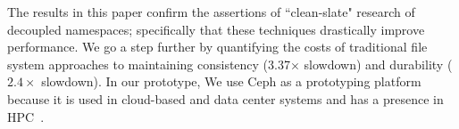 The results in this paper confirm the assertions of ``clean-slate" research of
decoupled namespaces; specifically that these techniques drastically improve
performance.  We go a step further by quantifying the costs of traditional file
system approaches to maintaining consistency (3.37\(\times\) slowdown) and
durability (\(2.4\times\) slowdown).  In our prototype,    We use Ceph as a prototyping platform because it is
used in cloud-based and data center systems and has a presence in
HPC~\cite{wang:pdsw13-ceph-hpc}.


